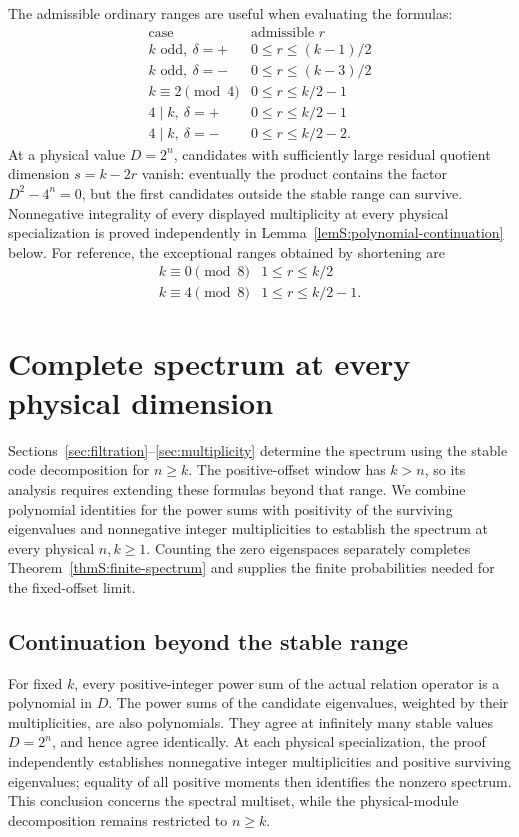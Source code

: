 \documentclass[journal,twocolumn]{IEEEtran}
\theoremstyle{definition}
\theoremstyle{plain}
\begin{document}
The admissible ordinary ranges are useful when evaluating the formulas:
\begin{equation}
 \begin{array}{c|c}
 \text{case}&\text{admissible }r\\ \hline
 k\text{ odd},\ \delta=+&0\leq r\leq(k-1)/2\\
 k\text{ odd},\ \delta=-&0\leq r\leq(k-3)/2\\
 k\equiv2\pmod4&0\leq r\leq k/2-1\\
 4\mid k,\ \delta=+&0\leq r\leq k/2-1\\
 4\mid k,\ \delta=-&0\leq r\leq k/2-2.
 \end{array}
 \label{eqS:ranges}
\end{equation}
At a physical value $D=2^n$, candidates with sufficiently large residual
quotient dimension $s=k-2r$ vanish: eventually the product contains the
factor $D^2-4^n=0$, but the first candidates outside the stable range can
survive.  Nonnegative integrality of every
displayed multiplicity at every physical specialization is proved
independently in Lemma~\ref{lemS:polynomial-continuation} below.
For reference, the exceptional ranges obtained by shortening are
\begin{equation}
 \begin{array}{c|c}
 k\equiv0\pmod8&1\leq r\leq k/2\\
 k\equiv4\pmod8&1\leq r\leq k/2-1.
 \end{array}
 \label{eqS:exceptional-ranges}
\end{equation}

\section{Complete spectrum at every physical dimension}
\label{sec:finite}
Sections~\ref{sec:filtration}--\ref{sec:multiplicity} determine the
spectrum using the stable code decomposition for $n\geq k$.  The
positive-offset window has $k>n$, so its analysis requires extending
these formulas beyond that range.  We combine polynomial identities
for the power sums with positivity of the surviving eigenvalues and
nonnegative integer multiplicities to establish the spectrum at every
physical $n,k\geq1$.  Counting the zero eigenspaces separately completes
Theorem~\ref{thmS:finite-spectrum} and supplies the finite probabilities
needed for the fixed-offset limit.

\subsection{Continuation beyond the stable range}
For fixed $k$, every positive-integer power sum of the actual relation
operator is a polynomial in $D$.  The power sums of the candidate
eigenvalues, weighted by their multiplicities, are also polynomials.
They agree at infinitely many stable values $D=2^n$, and hence agree
identically.  At each physical specialization, the proof independently
establishes nonnegative integer multiplicities and positive surviving
eigenvalues; equality of all positive moments then identifies the
nonzero spectrum.  This conclusion concerns the spectral multiset,
while the physical-module decomposition remains restricted to $n\geq k$.
\end{document}
